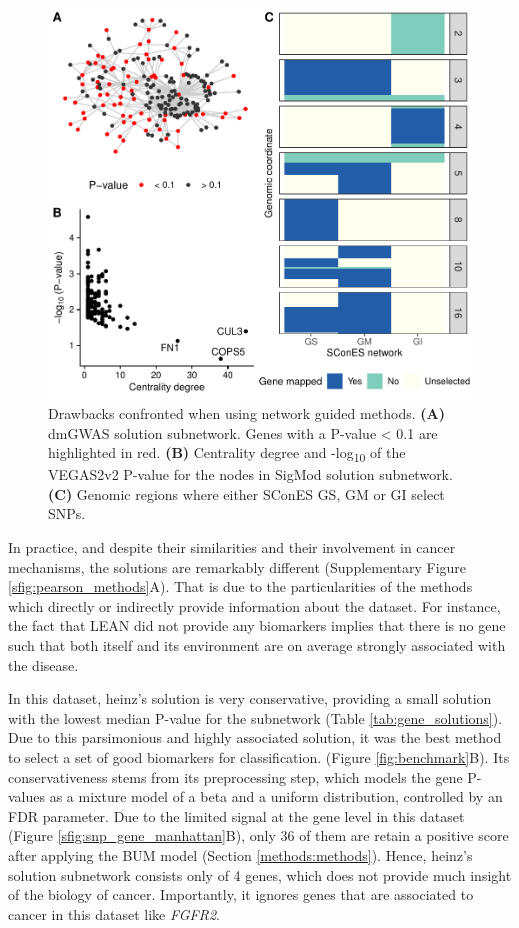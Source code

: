 \documentclass[twocolumn, 11pt, draft]{article}
\begin{document}
\begin{figure}[htbp]
\centering
\includegraphics[width=.8\linewidth]{./figures/figure_2.pdf}
\caption{\label{fig:issues}
Drawbacks confronted when using network guided methods. \textbf{(A)} dmGWAS solution subnetwork. Genes with a P-value < 0.1 are highlighted in red. \textbf{(B)} Centrality degree and -log\textsubscript{10} of the VEGAS2v2 P-value for the nodes in SigMod solution subnetwork. \textbf{(C)} Genomic regions where either SConES GS, GM or GI select SNPs.}
\end{figure}

In practice, and despite their similarities and their involvement in cancer mechanisms, the solutions are remarkably different (Supplementary Figure \ref{sfig:pearson_methods}A). That is due to the particularities of the methods which directly or indirectly provide information about the dataset. For instance, the fact that LEAN did not provide any biomarkers implies that there is no gene such that both itself and its environment are on average strongly associated with the disease. 

In this dataset, heinz's solution is very conservative, providing a small solution with the lowest median P-value for the subnetwork (Table \ref{tab:gene_solutions}). Due to this parsimonious and highly associated solution, it was the best method to select a set of good biomarkers for classification. (Figure \ref{fig:benchmark}B). Its conservativeness stems from its preprocessing step, which models the gene P-values as a mixture model of a beta and a uniform distribution, controlled by an FDR parameter. Due to the limited signal at the gene level in this dataset (Figure \ref{sfig:snp_gene_manhattan}B), only 36 of them are retain a positive score after applying the BUM model (Section \ref{methods:methods}). Hence, heinz's solution subnetwork consists only of 4 genes, which does not provide much insight of the biology of cancer. Importantly, it ignores genes that are associated to cancer in this dataset like \emph{FGFR2}. 
\end{document}
